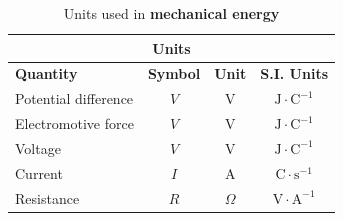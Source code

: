 \begin{table}[H]
\begin{center}
\begin{tabular}{|l|c|c|c|}\hline \hline 
\multicolumn{4}{|c|}{\textbf{Units}}\\ \hline \hline
\textbf{Quantity} & \textbf{Symbol} & \textbf{Unit} & \textbf{S.I. Units}\\ \hline
Potential difference & $V$ & V & $\text{J}\cdot\text{C}^{-1}$ \\ \hline
Electromotive force & $V$ & V & $\text{J}\cdot\text{C}^{-1}$ \\ \hline
Voltage & $V$ & V & $\text{J}\cdot\text{C}^{-1}$ \\ \hline
Current & $I$ & A & $\text{C}\cdot\text{s}^{-1}$ \\ \hline
Resistance & $R$ & $\Omega$ & $\text{V}\cdot\text{A}^{-1}$ \\ \hline
\end{tabular}
\end{center}
\caption{Units used in \textbf{mechanical energy} }
\label{table:electricity::units}
\end{table}



